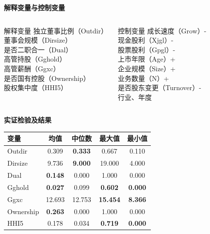 \documentclass[aspectratio=169,UTF8,zihao=-4]{ctexbeamer}
\newcommand{\bigidea}[1]{
  \begin{center}
    \vspace{0.8em}
    {\LARGE \bfseries #1}
    \vspace{0.6em}
  \end{center}
}
\newcommand{\sectionpageframe}[1]{
  \begin{frame}[plain]
    \begin{center}
      \vfill
      {\Huge \bfseries #1}
      \vfill
    \end{center}
  \end{frame}
}
\begin{document}
\begin{frame}
  \bigidea{解释变量与控制变量}
  \begin{columns}[T]
    \begin{block}{解释变量}
      \Large
      独立董事比例（Outdir）\\
      董事会规模（Dirsize）\\
      是否二职合一（Dual）\\
      高管持股（Gghold） \\
      高管薪酬（Ggxc）\\
      是否国有控股（Ownership）\\
      股权集中度（HHI5）
    \end{block}
    \begin{block}{控制变量}
      \Large
      成长速度（Grow）-\\
      现金股利（Xjgl）-\\
      股票股利（Gpgl）-\\
      上市年限（Age）+\\
      企业规模（Size）+\\
      业务数量（N）+ \\
      是否股东变更（Turnover）- \\
      行业、年度
    \end{block}
  \end{columns}
\end{frame}

\sectionpageframe{实证检验及结果}

\begin{frame}
  \centering
  \Large
  \begin{tabular}{lcccc}
    \toprule
    变量 & 均值 & 中位数 & 最大值 & 最小值 \\
    \midrule
    Outdir & 0.309 & \textbf{0.333} & 0.667 & 0.110 \\
    Dirsize & 9.736 & \textbf{9.000} & 19.000 & 4.000 \\
    Dual & \textbf{0.148} & 0.000 & 1.000 & 0.000 \\
    Gghold & \textbf{0.027} & 0.099 & \textbf{0.602} & \textbf{0.000} \\
    Ggxc & 12.693 & 12.753 & \textbf{15.454} & \textbf{8.366} \\
    Ownership & \textbf{0.263} & 0.000 & 1.000 & 0.000 \\
    HHI5 & 0.178 & 0.034 & \textbf{0.719} & \textbf{0.000} \\
    \bottomrule
  \end{tabular}
\vspace{0.6em}
\end{frame}
\end{document}
